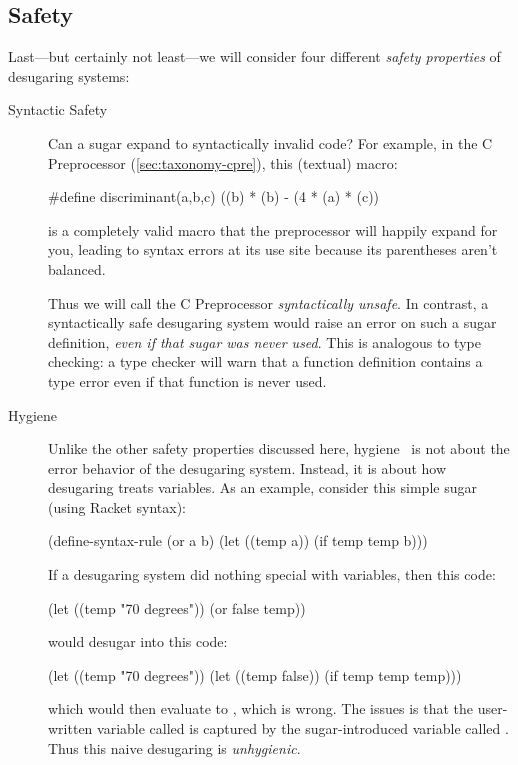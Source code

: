 \subsection{Safety}\label{sec:taxonomy-safety}

Last---but certainly not least---we will consider four different
\emph{safety properties} of desugaring systems:
\begin{description}
  \item[Syntactic Safety] Can a sugar expand to syntactically invalid
    code? For example, in the C Preprocessor (\cref{sec:taxonomy-cpre}), this
    (textual) macro:
\begin{CorrectlyIndentedCodes}
#define discriminant(a,b,c) ((b) * (b) - (4 * (a) * (c))
\end{CorrectlyIndentedCodes}
    is a completely valid macro that the preprocessor will happily
    expand for you, leading to syntax errors at its use site because
    its parentheses aren't balanced.

    Thus we will call the C Preprocessor \emph{syntactically unsafe}.
    In contrast, a syntactically safe desugaring system would raise an
    error on such a sugar definition, \emph{even if that sugar was
      never used}. This is analogous to type checking: a type checker
    will warn that a function definition contains a type error even
    if that function is never used.
  \item[Hygiene] Unlike the other safety properties discussed here,
    hygiene~\cite{hygienic-macros} is not about the error behavior of the desugaring
    system.  Instead, it is about how desugaring treats variables. As
    an example, consider this simple  sugar (using Racket
    syntax):
\begin{CorrectlyIndentedCodes}
(define-syntax-rule
  (or a b)
  (let ((temp a)) (if temp temp b)))
\end{CorrectlyIndentedCodes}
    If a desugaring system did nothing special with variables, then
    this code:
\begin{CorrectlyIndentedCodes}
(let ((temp "70 degrees"))
  (or false temp))
\end{CorrectlyIndentedCodes}
    would desugar into this code:
\begin{CorrectlyIndentedCodes}
(let ((temp "70 degrees"))
  (let ((temp false)) (if temp temp temp)))
\end{CorrectlyIndentedCodes}
    which would then evaluate to , which is wrong. The
    issues is that the user-written variable called  is
    captured by the sugar-introduced variable called .
    Thus this naive desugaring is \emph{unhygienic}.
    

\end{description}
